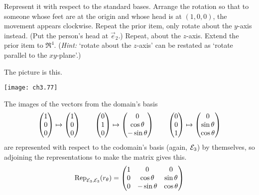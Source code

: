 \begin{exercises}
\begin{exparts}
        Represent it with respect to the standard bases.
        Arrange the rotation so that 
        to someone whose feet are at the origin and
        whose head is at \( (1,0,0) \), the movement appears clockwise.
      \partsitem Repeat the prior item, only rotate about the \( y \)-axis 
        instead.
        (Put the person's head at $\vec{e}_2$.)
      \partsitem Repeat, about the \( z \)-axis.
      \partsitem Extend the prior item to \( \Re^4 \).
        (\textit{Hint:} 
        `rotate about the \( z \)-axis' can be restated as `rotate parallel
        to the \( xy \)-plane'.)
    \end{exparts}
    \begin{answer}
      \begin{exparts}
        \partsitem The picture is this.
          \begin{center}  \small
            \texttt{[image: ch3.77]}
         \end{center}
         The images of the vectors from the domain's basis 
         \begin{equation*}
           \colvec{1 \\ 0 \\ 0}\mapsto\colvec{1 \\ 0 \\ 0}
           \qquad
           \colvec{0 \\ 1 \\ 0}\mapsto\colvec{0 \\ \cos\theta \\ -\sin\theta}
           \qquad
           \colvec{0 \\ 0 \\ 1}\mapsto\colvec{0 \\ \sin\theta \\ \cos\theta}
         \end{equation*}
         are represented with respect to the codomain's basis
         (again, $\stdbasis_3$) by themselves, 
         so adjoining the representations to
         make the matrix gives this.
         \begin{equation*}
            \rep{r_\theta}{\stdbasis_3,\stdbasis_3}=
            \begin{pmatrix}
              1  &0       &0                \\
              0  &\cos\theta   &\sin\theta   \\
              0  &-\sin\theta  &\cos\theta
            \end{pmatrix}                  
         \end{equation*}

\end{exparts}
\end{answer}
\end{exercises}
